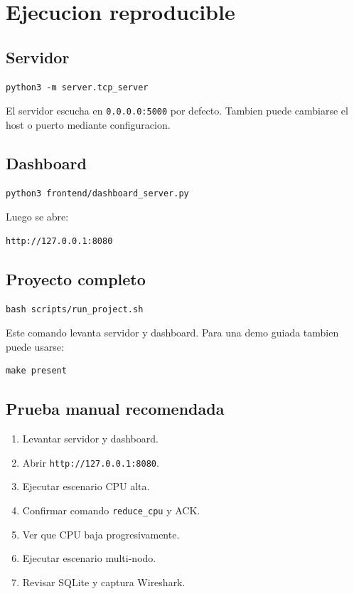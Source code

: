 \documentclass[11pt,letterpaper]{article}
\begin{document}
\newpage
\section{Ejecucion reproducible}

\subsection{Servidor}

\begin{lstlisting}[style=terminal]
python3 -m server.tcp_server
\end{lstlisting}

El servidor escucha en \texttt{0.0.0.0:5000} por defecto. Tambien puede cambiarse
el host o puerto mediante configuracion.

\subsection{Dashboard}

\begin{lstlisting}[style=terminal]
python3 frontend/dashboard_server.py
\end{lstlisting}

Luego se abre:

\begin{lstlisting}[style=terminal]
http://127.0.0.1:8080
\end{lstlisting}

\subsection{Proyecto completo}

\begin{lstlisting}[style=terminal]
bash scripts/run_project.sh
\end{lstlisting}

Este comando levanta servidor y dashboard. Para una demo guiada tambien puede
usarse:

\begin{lstlisting}[style=terminal]
make present
\end{lstlisting}

\subsection{Prueba manual recomendada}

\begin{enumerate}
  \item Levantar servidor y dashboard.
  \item Abrir \texttt{http://127.0.0.1:8080}.
  \item Ejecutar escenario CPU alta.
  \item Confirmar comando \texttt{reduce\_cpu} y ACK.
  \item Ver que CPU baja progresivamente.
  \item Ejecutar escenario multi-nodo.
  \item Revisar SQLite y captura Wireshark.
\end{enumerate}
\end{document}
